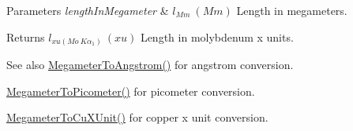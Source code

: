 \begin{DoxyParams}{Parameters}
{\em length\+In\+Megameter} & $ l_{Mm}\ (Mm)$ Length in megameters. \\
\hline
\end{DoxyParams}
\begin{DoxyReturn}{Returns}
$ l_{xu(Mo\ K\alpha_1)}\ (xu)$ Length in molybdenum x units. 
\end{DoxyReturn}
\begin{DoxySeeAlso}{See also}
\mbox{\hyperlink{group___e_g_x_math-_conversions-_length_conversions-_megameter-_non-_s_i_gac4c7e615f4ec3d000ac341a5bf9a79a0}{Megameter\+To\+Angstrom()}} for angstrom conversion. 

\mbox{\hyperlink{group___e_g_x_math-_conversions-_length_conversions-_megameter-_s_i_ga0f6585bdcd16b6748b6c4d9116dd955c}{Megameter\+To\+Picometer()}} for picometer conversion. 

\mbox{\hyperlink{group___e_g_x_math-_conversions-_length_conversions-_megameter-_non-_s_i_gae44ce2fd3e740a5aec1546ed10c83447}{Megameter\+To\+Cu\+X\+Unit()}} for copper x unit conversion. 
\end{DoxySeeAlso}
